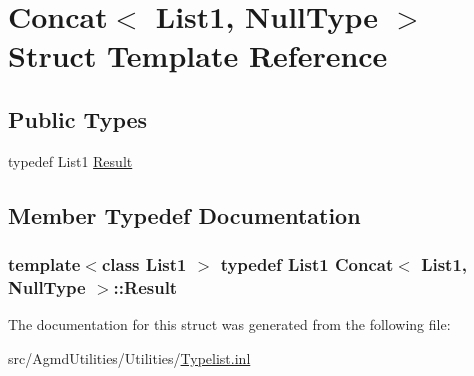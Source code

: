 \hypertarget{struct_concat_3_01_list1_00_01_null_type_01_4}{\section{Concat$<$ List1, Null\+Type $>$ Struct Template Reference}
\label{struct_concat_3_01_list1_00_01_null_type_01_4}
}
\subsection*{Public Types}
\begin{DoxyCompactItemize}
\item 
typedef List1 \hyperlink{struct_concat_3_01_list1_00_01_null_type_01_4_a14a903b0a775dc5baea1fac7943358fb}{Result}
\end{DoxyCompactItemize}


\subsection{Member Typedef Documentation}
\hypertarget{struct_concat_3_01_list1_00_01_null_type_01_4_a14a903b0a775dc5baea1fac7943358fb}{
\subsubsection[{Result}]{\setlength{\rightskip}{0pt plus 5cm}template$<$class List1 $>$ typedef List1 {\bf Concat}$<$ List1, Null\+Type $>$\+::{\bf Result}}}\label{struct_concat_3_01_list1_00_01_null_type_01_4_a14a903b0a775dc5baea1fac7943358fb}


The documentation for this struct was generated from the following file\+:\begin{DoxyCompactItemize}
\item 
src/\+Agmd\+Utilities/\+Utilities/\hyperlink{_typelist_8inl}{Typelist.\+inl}\end{DoxyCompactItemize}
